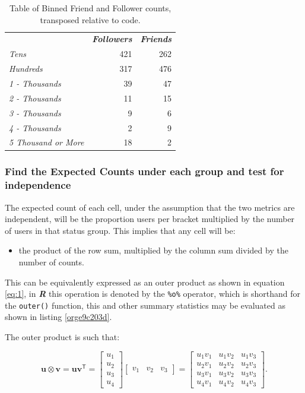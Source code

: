 \documentclass[11pt]{article}
\begin{document}
\begin{table}[htbp]
\caption{\label{tab:orgf61630c}Table of Binned Friend and Follower counts, transposed relative to code.}
\centering
\begin{tabular}{lrr}
 & \textbf{\textbf{\emph{Followers}}} & \textbf{\textbf{\emph{Friends}}}\\
\emph{Tens} & 421 & 262\\
\emph{Hundreds} & 317 & 476\\
\emph{1 - Thousands} & 39 & 47\\
\emph{2 - Thousands} & 11 & 15\\
\emph{3 - Thousands} & 9 & 6\\
\emph{4 - Thousands} & 2 & 9\\
\emph{5 Thousand or More} & 18 & 2\\
\end{tabular}
\end{table}

\subsubsection{Find the Expected Counts under each group and test for independence}
\label{sec:org84b2147}
The expected count of each cell, under the assumption that the two metrics are
independent, will be the proportion users per bracket multiplied by the number
of users in that status group. This implies that any cell will be:

\begin{itemize}
\item the product of the row sum, multiplied by the column sum divided by the number of counts.
\end{itemize}

This can be equivalently expressed as an outer product as shown in equation
\eqref{eq:1}, in \textbf{\emph{R}} this operation is denoted by the \texttt{\%o\%} operator, which is
shorthand for the \texttt{outer()} function, this and other summary statistics may be
evaluated as shown in listing \ref{orge9c203d}.

The outer product is such that:


$$
\mathbf{u} \otimes \mathbf {v} =\mathbf {u} \mathbf {v} ^{\textsf {T}}={\begin{bmatrix}u_{1}\\u_{2}\\u_{3}\\u_{4}\end{bmatrix}}{\begin{bmatrix}v_{1}&v_{2}&v_{3}\end{bmatrix}}={\begin{bmatrix}u_{1}v_{1}&u_{1}v_{2}&u_{1}v_{3}\\u_{2}v_{1}&u_{2}v_{2}&u_{2}v_{3}\\u_{3}v_{1}&u_{3}v_{2}&u_{3}v_{3}\\u_{4}v_{1}&u_{4}v_{2}&u_{4}v_{3}\end{bmatrix}}.
$$
\end{document}
